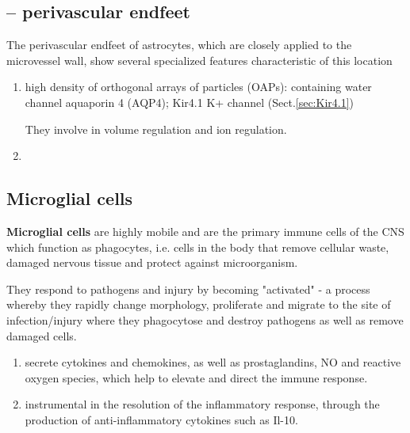 \subsection{-- perivascular endfeet}
\label{sec:astrocyte-perivascular-endfeet}

The perivascular endfeet of astrocytes, which are closely applied to the
microvessel wall, show several specialized features characteristic of this
location
\begin{enumerate}
  \item high density of orthogonal arrays of particles (OAPs): containing water
  channel aquaporin 4 (AQP4); Kir4.1 K+ channel (Sect.\ref{sec:Kir4.1})
  
  They involve in volume regulation and ion regulation.
  
  \item 
\end{enumerate}


\subsection{Microglial cells}
\label{sec:microglial-cell}
  
{\bf Microglial cells} are highly mobile and are the primary immune cells of the
CNS which function as phagocytes, i.e. cells in the body that remove cellular
waste, damaged nervous tissue and protect against microorganism.

They respond to pathogens and injury by becoming "activated"
- a process whereby they rapidly change morphology, proliferate and migrate to
the site of infection/injury where they phagocytose and destroy pathogens as
well as remove damaged cells.
\begin{enumerate}
  \item secrete cytokines and chemokines, as well as prostaglandins, NO and
  reactive oxygen species, which help to elevate and direct the immune response. 
  
  \item instrumental in the resolution of the inflammatory response, through the
  production of anti-inflammatory cytokines such as Il-10.
\end{enumerate}


